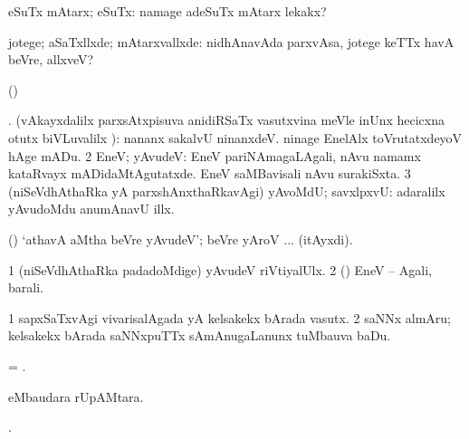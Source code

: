 {{{{{{\bentry
{} 
\gl{\kirxvi}
\expl{}
\bmng
eSuTx mAtarx; eSuTx:  namage adeSuTx mAtarx lekakx? 
\emng

\noindent 
\gl{\pagu}
\expl{}
\bmng
{} jotege; aSaTxllxde; mAtarxvallxde:  nidhAnavAda parxvAsa, jotege keTTx havA beVre, allxveV? 
\emng
\eentry

\bentry
{} 
\expl{}
\bmng
(\kAparx)  
\emng
\eentry

\bentry
{} 
\expl{}
\bmng
\bnum
{} 
\banum
{}  
 . (vAkayxdalilx parxsAtxpisuva anidiRSaTx vasutxvina meVle inUnx hecicxna otutx biVLuvalilx \parx):  nananx sakalvU ninanxdeV.  ninage EnelAlx toVrutatxdeyoV hAge mADu. 
\eanum
\numie
\num{2} EneV; yAvudeV:  EneV pariNAmagaLAgali, nAvu namamx kataRvayx mADidaMtAgutatxde.  EneV saMBavisali nAvu surakiSxta. 
\num{3} (niSeVdhAthaRka yA parxshAnxthaRkavAgi) yAvoMdU; savxlpxvU:  adaralilx yAvudoMdu anumAnavU illx. 
\enum
\emng

\noindent 
\gl{\pagu}
\expl{}
\bmng
{} (\AmA) `athavA aMtha beVre yAvudeV'; beVre yAroV ... (itAyxdi). 
\emng
\eentry

 \bentry
{}
\gl{\kirxvi}
\expl{}
\bmng
\bnum
\num{1} (niSeVdhAthaRka padadoMdige) yAvudeV riVtiyalUlx. 
\num{2} (\anw) EneV -- Agali, barali. 
\enum
\emng
\eentry

\bentry
{} 
\gl{\nA}
\expl{}
\bmng
\bnum
\num{1} sapxSaTxvAgi vivarisalAgada yA kelsakekx bArada vasutx. 
\num{2} saNNx almAru; kelsakekx bArada saNNxpuTTx sAmAnugaLanunx tuMbauva baDu. 
\enum
\emng
\eentry

\bentry
{} 
\expl{(\pArxparx)}
\bmng
= . 
\emng
\eentry

\bentry
{} 
\expl{(\kAparx)}
\bmng
  eMbaudara rUpAMtara. 
\emng
\eentry

\bentry
{} 
\expl{}
\bmng
{}. 
\emng
\eentry

}}}}}}

